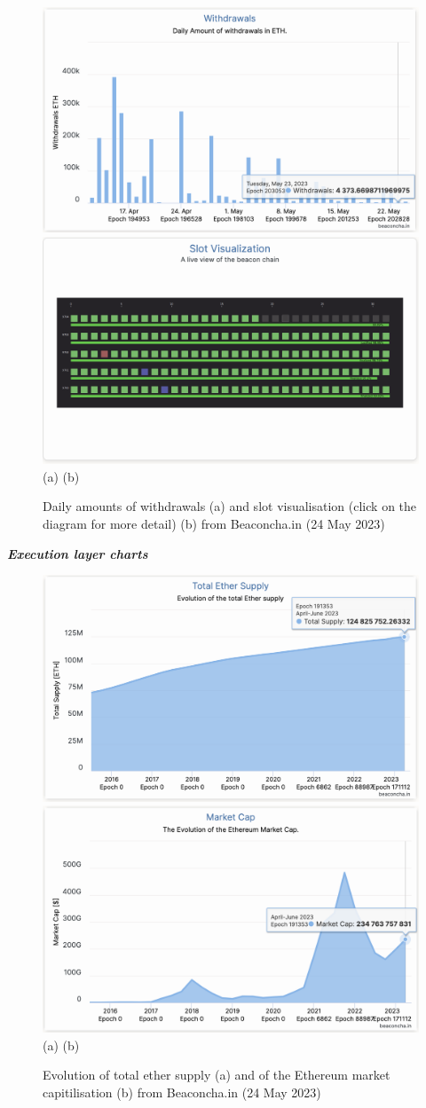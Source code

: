 \documentclass[UTF8]{article}
\begin{document}
\begin{figure}[htbp]
\begin{center}
\includegraphics[width=0.48\linewidth]{images/bchart15}
\includegraphics[width=0.48\linewidth]{images/bchart16} \\
(a)\hspace{160pt}        (b)\\
\caption{Daily amounts of withdrawals (a) and slot visualisation (click on the diagram for more detail) (b) from Beaconcha.in (24 May 2023)}
\label{fig:chart15}
\end{center}
\end{figure}
\clearpage

\textit{\textbf{Execution layer charts}}
\begin{figure}[htbp]
\begin{center}
\includegraphics[width=0.48\linewidth]{images/bchart17}
\includegraphics[width=0.48\linewidth]{images/bchart18} \\
(a)\hspace{160pt}        (b)\\
\caption{Evolution of total ether supply (a) and of the Ethereum market capitilisation (b) from Beaconcha.in (24 May 2023)}
\label{fig:chart17}
\end{center}
\end{figure}
\end{document}
